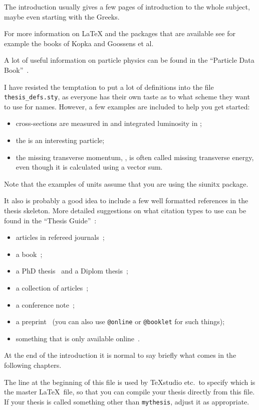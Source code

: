 The introduction usually gives a few pages of introduction to the
whole subject, maybe even starting with the Greeks.

For more information on \LaTeX{} and the packages that are available
see for example the books of Kopka and Goossens et
al.

A lot of useful information on particle physics can be found in the
\enquote{Particle Data Book}~\cite{pdg2010}.

I have resisted the temptation to put a lot of definitions into the
file \texttt{thesis\_defs.sty}, as everyone has their own taste as
to what scheme they want to use for names.
However, a few examples are included to help you get started:
\begin{itemize}
\setlength{\itemsep}{0pt}\setlength{\parskip}{0pt}
\item cross-sections are measured in \si{\pb} and integrated
  luminosity in \si{\invpb};
\item the \KoS is an interesting particle;
\item the missing transverse momentum, \pTmiss, is often called
  missing transverse energy, even though it is calculated using a vector sum.
\end{itemize}
Note that the examples of units assume that you are using the
\textsf{siunitx} package.

It also is probably a good idea to include a few well formatted
references in the thesis skeleton. More detailed suggestions on what
citation types to use can be found in the \enquote{Thesis Guide}~\cite{thesis-guide}:
\begin{itemize}
\item articles in refereed journals~\cite{pdg2010,Aad:2010ey};
\item a book~\cite{Halzen:1984mc};
\item a PhD thesis~\cite{tlodd:2012} and a Diplom thesis~\cite{mergelmeyer:2011};
\item a collection of articles~\cite{lhc:vol1};
\item a conference note~\cite{ATLAS-CONF-2011-008};
\item a preprint~\cite{atlas:perf:2009} (you can also use
  \texttt{@online} or \texttt{@booklet} for such things);
\item something that is only available online~\cite{thesis-guide}.
\end{itemize}

At the end of the introduction it is normal to say briefly what comes
in the following chapters.

The line at the beginning of this file is used by TeXstudio etc.\ to
specify which is the master \LaTeX\ file, so that you can compile your thesis
directly from this file.
If your thesis is called something other than \texttt{mythesis}, adjust it as appropriate.


